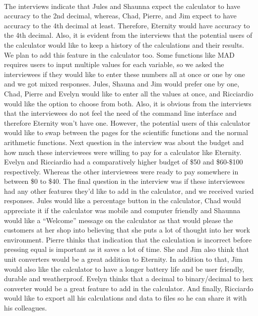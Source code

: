 \documentclass[titlepage]{article}
\begin{document}
        \paragraph{}
        The interviews indicate that Jules and Shaunna expect the calculator to have accuracy to the 2nd decimal, whereas, Chad, Pierre, and Jim expect to have accuracy to the 4th decimal at least. Therefore, Eternity would have accuracy to the 4th decimal. Also, it is evident from the interviews that the potential users of the calculator would like to keep a history of the calculations and their results. We plan to add this feature in the calculator too. Some functions like MAD  requires users to input multiple values for each variable, so we asked the interviewees if they would like to enter these numbers all at once or one by one and we got mixed responses. Jules, Shauna and Jim would prefer one by one, Chad, Pierre and Evelyn would like to enter all the values at once, and Ricciardio would like the option to choose from both. Also, it is obvious from the interviews that the interviewees do not feel the need of the command line interface and therefore Eternity won’t have one. However, the potential users of this calculator would like to swap between the pages for the scientific functions and the normal arithmetic functions. Next question in the interview was about the budget and how much these interviewees were willing to pay for a calculator like Eternity. Evelyn and Ricciardio had a comparatively higher budget of \$50 and \$60-\$100 respectively. Whereas the other interviewees were ready to pay somewhere in between \$0 to \$40. The final question in the interview was if these interviewees had any other features they’d like to add in the calculator, and we received varied responses. Jules would like a percentage button in the calculator, Chad would appreciate it if the calculator was mobile and computer friendly and Shaunna would like a “Welcome” message on the calculator as that would please the customers at her shop into believing that she puts a lot of thought into her work environment. Pierre thinks that indication that the calculation is incorrect before pressing equal is important as it saves a lot of time. She and Jim also think that unit converters would be a great addition to Eternity. In addition to that, Jim would also like the calculator to have a longer battery life and be user friendly, durable and weatherproof. Evelyn thinks that a decimal to binary/decimal to hex converter would be a great feature to add in the calculator. And finally, Ricciardo would like to export all his calculations and data to files so he can share it with his colleagues.
            
\end{document}
